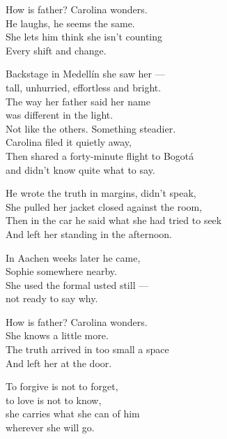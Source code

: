 \begin{lyrics}
How is father? Carolina wonders.\\
He laughs, he seems the same.\\
She lets him think she isn't counting\\
Every shift and change.

Backstage in Medellín she saw her —\\
tall, unhurried, effortless and bright.\\
The way her father said her name\\
was different in the light.\\
Not like the others. %
Something steadier.\\
Carolina filed it quietly away,\\
Then shared a forty-minute flight to Bogotá\\
and didn't know quite what to say.

He wrote the truth in margins, didn't speak,\\
She pulled her jacket closed against the room,\\
Then in the car he said what she had tried to seek\\
And left her standing in the afternoon.

In Aachen weeks later he came,\\
Sophie somewhere nearby.\\
She used the formal usted still —\\
not ready to say why.

How is father? Carolina wonders.\\
She knows a little more.\\
The truth arrived in too small a space\\
And left her at the door.

To forgive is not to forget,\\
to love is not to know,\\
she carries what she can of him\\
wherever she will go.

\end{lyrics}

